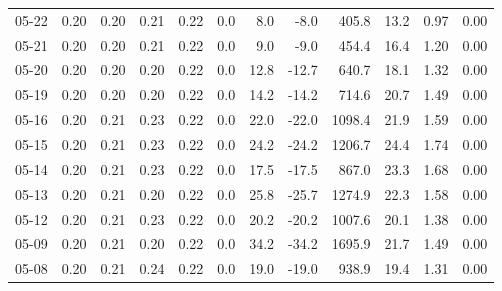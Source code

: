 \begin{threeparttable}
{\begin{tabular}{lrrrrrrrrrrr}
  05-22 &          0.20 &          0.20 &          0.21 &        0.22 &                 0.0 &                 8.0 &       -8.0 &               405.8 &             13.2 &            0.97 &                   0.00 \\
  05-21 &          0.20 &          0.20 &          0.21 &        0.22 &                 0.0 &                 9.0 &       -9.0 &               454.4 &             16.4 &            1.20 &                   0.00 \\
  05-20 &          0.20 &          0.20 &          0.20 &        0.22 &                 0.0 &                12.8 &      -12.7 &               640.7 &             18.1 &            1.32 &                   0.00 \\
  05-19 &          0.20 &          0.20 &          0.20 &        0.22 &                 0.0 &                14.2 &      -14.2 &               714.6 &             20.7 &            1.49 &                   0.00 \\
  05-16 &          0.20 &          0.21 &          0.23 &        0.22 &                 0.0 &                22.0 &      -22.0 &              1098.4 &             21.9 &            1.59 &                   0.00 \\
  05-15 &          0.20 &          0.21 &          0.23 &        0.22 &                 0.0 &                24.2 &      -24.2 &              1206.7 &             24.4 &            1.74 &                   0.00 \\
  05-14 &          0.20 &          0.21 &          0.23 &        0.22 &                 0.0 &                17.5 &      -17.5 &               867.0 &             23.3 &            1.68 &                   0.00 \\
  05-13 &          0.20 &          0.21 &          0.20 &        0.22 &                 0.0 &                25.8 &      -25.7 &              1274.9 &             22.3 &            1.58 &                   0.00 \\
  05-12 &          0.20 &          0.21 &          0.23 &        0.22 &                 0.0 &                20.2 &      -20.2 &              1007.6 &             20.1 &            1.38 &                   0.00 \\
  05-09 &          0.20 &          0.21 &          0.20 &        0.22 &                 0.0 &                34.2 &      -34.2 &              1695.9 &             21.7 &            1.49 &                   0.00 \\
  05-08 &          0.20 &          0.21 &          0.24 &        0.22 &                 0.0 &                19.0 &      -19.0 &               938.9 &             19.4 &            1.31 &                   0.00 \\

\end{tabular}}
\end{threeparttable}
